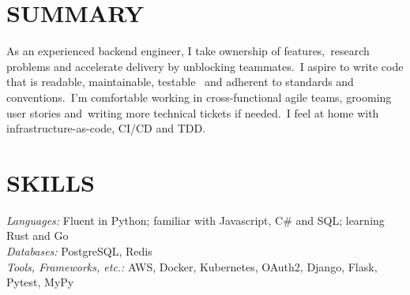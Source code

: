 \documentclass[line,margin]{res}
\begin{document}
\address{\href{mailto://simon.r.crowe@protonmail.com}{simon.r.crowe@protonmail.com}}

 
\begin{resume}
 
\section{SUMMARY} As an experienced backend engineer, I take ownership of features,\
                  research problems and accelerate delivery by unblocking teammates.\
                  I aspire to write code that is readable, maintainable, testable \
                  and adherent to standards and conventions.\
                  I'm comfortable working in cross-functional agile teams, grooming user stories and\
                  writing more technical tickets if needed.\ 
                  I feel at home with infrastructure-as-code, CI/CD and TDD.

 
\section{SKILLS} {\sl Languages:} Fluent in Python;
                familiar with Javascript, C\# and SQL; learning Rust and Go \\
                {\sl Databases:} PostgreSQL, Redis \\
                {\sl Tools, Frameworks, etc.:} AWS, Docker, Kubernetes, OAuth2, Django, Flask, Pytest, MyPy

 

\end{resume}
\end{document}
